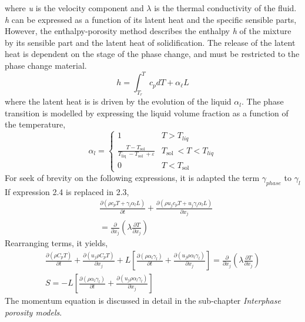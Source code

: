 where \textit{u} is the velocity component and $\lambda$ is the thermal conductivity of the fluid. \textit{h} can be expressed as a function of its latent heat and the specific sensible parts,
\newline
However, the enthalpy-porosity method describes the enthalpy \textit{h} of the mixture by its sensible part and the latent heat of solidification.
The release of the latent heat is dependent on the stage of the phase change, and must be restricted to the phase change material.
\begin{equation}
	h=\int_{T_{r}}^{T} c_{p} d T+\alpha_{\ell} L
\end{equation}
where the latent heat is is driven by the evolution of the liquid $\alpha_{l}$. The phase transition is modelled by expressing the liquid volume fraction as a function of the temperature,
\begin{equation}
	\alpha_{l}= \begin{cases}
		1 & T>T_{l i q} \\ \frac{T-T_{\text {sol }}}{T_{\text {liq }}-T_{\text {sol }}+\varepsilon} & T_{\text {sol }}<T<T_{l i q} \\ 0 & T<T_{\text {sol }}
	\end{cases}
\end{equation}
For seek of brevity on the following expressions, it is adapted the term $\gamma_{phase}$ to $\gamma_{l}$ 
If expression 2.4 is replaced in 2.3,
\begin{equation}
	\begin{aligned}
		&\frac{\partial\left(\rho c_{p} T + \gamma_{l} \alpha_{l} L\right)}{\partial t}+\frac{\partial\left(\rho u_{j} c_{p} T + u_{j}\gamma_{l} \alpha_{l} L\right)}{\partial x_{j}} \\
		&=\frac{\partial}{\partial x_{j}}\left(\lambda \frac{\partial T}{\partial x_{j}}\right) 
	\end{aligned}
\end{equation}
Rearranging terms, it yields,
\begin{equation}
	\begin{aligned}
		\frac{\partial (\rho C_{p} T)}{\partial t}+ \frac{\partial (u_{j}\rho C_{p} T)}{\partial x_{j}}+L\left[\frac{\partial (\rho \alpha_{l}\gamma_{l})}{\partial t}+ \frac{\partial (u_{j}\rho \alpha_{l}\gamma_{l})}{\partial x_{j}}\right]=\frac{\partial}{\partial x_{j}}\left(\lambda \frac{\partial T}{\partial x_{j}}\right)  \\
		S = -L\left[\frac{\partial (\rho \alpha_{l}\gamma_{l})}{\partial t}+ \frac{\partial (u_{j}\rho \alpha_{l}\gamma_{l})}{\partial x_{j}}\right]
	\end{aligned}
\end{equation}
The momentum equation is discussed in detail in the sub-chapter \textit{Interphase porosity models}.

